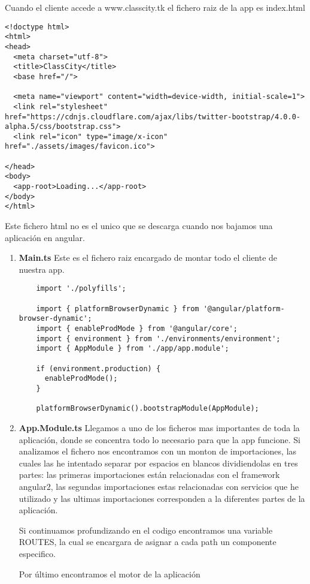 Cuando el cliente accede a www.classcity.tk el fichero raiz de la app es index.html
\begin{lstlisting}
<!doctype html>
<html>
<head>
  <meta charset="utf-8">
  <title>ClassCity</title>
  <base href="/">
  
  <meta name="viewport" content="width=device-width, initial-scale=1">
  <link rel="stylesheet" href="https://cdnjs.cloudflare.com/ajax/libs/twitter-bootstrap/4.0.0-alpha.5/css/bootstrap.css">
  <link rel="icon" type="image/x-icon" href="./assets/images/favicon.ico">
  
</head>
<body>
  <app-root>Loading...</app-root>
</body>
</html>
\end{lstlisting}
Este fichero html no es el unico que se descarga cuando nos bajamos una aplicación en angular.
\begin{enumerate}

    \item \textbf {Main.ts} Este es el fichero raiz encargado de montar todo el cliente de nuestra app.
    \begin{lstlisting}
    import './polyfills';
    
    import { platformBrowserDynamic } from '@angular/platform-browser-dynamic';
    import { enableProdMode } from '@angular/core';
    import { environment } from './environments/environment';
    import { AppModule } from './app/app.module';
    
    if (environment.production) {
      enableProdMode();
    }
    
    platformBrowserDynamic().bootstrapModule(AppModule);

    \end{lstlisting}
    \item \textbf {App.Module.ts} Llegamos a uno de los ficheros mas importantes de toda la aplicación, donde se concentra todo lo necesario para que la app funcione. Si analizamos el fichero nos encontramos con un monton de importaciones, las cuales las he intentado separar por espacios en blancos dividiendolas en tres partes: las primeras
    importaciones están relacionadas con el
    framework angular2, las segundas importaciones estas
    relacionadas con servicios que he utilizado y las
    ultimas importaciones corresponden a la diferentes partes de la aplicación. 
    
    Si continuamos profundizando en el codigo encontramos una variable ROUTES, la cual se encargara de asignar a cada path un componente especifico.
    
    Por último encontramos el motor de la aplicación 
\end{enumerate}
